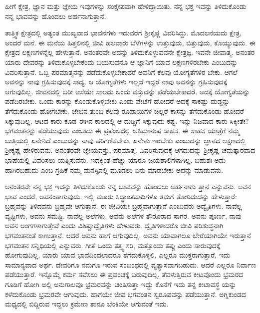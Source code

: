 {\small ಹೀಗೆ ಕ್ಷೇತ್ರ, ಜ್ಞಾನ ಮತ್ತು ಜ್ಞೇಯ ಇವುಗಳನ್ನು ಸಂಕ್ಷೇಪವಾಗಿ ಹೇಳಿದ್ದಾಯಿತು. ನನ್ನ ಭಕ್ತ ಇವನ್ನು ತಿಳಿದುಕೊಂಡು ನನ್ನ ಭಾವವನ್ನು ಹೊಂದಲು ಅರ್ಹನಾಗುತ್ತಾನೆ.}

ತಾತ್ತ್ವಿಕ ಕ್ಷೇತ್ರದಲ್ಲಿ ಅತ್ಯಂತ ಮುಖ್ಯವಾದ ಭಾವನೆಗಳು ಇದುವರೆಗೆ ಶ್ರೀಕೃಷ್ಣ ವಿವರಿಸಿದ್ದು. ಮೊದಲನೆಯದು ಕ್ಷೇತ್ರ, ಅಂದರೆ ಮನೆ. ಈ ಮನೆಯ ಹಿತ್ತಲಿನಲ್ಲಿ ಜೀವಿ ಹಲವಾರು ಬೆಳೆಗಳನ್ನು ಉತ್ತುವುದು, ಬಿತ್ತುವುದು, ಕೊಯ್ಯುವುದು. ಈ ಕ್ಷೇತ್ರದ ಲಕ್ಷಣಗಳನ್ನೆಲ್ಲ ಹೇಳುತ್ತಾನೆ. ಅನಂತರವೇ ಅದನ್ನು ತಿಳಿದುಕೊಳ್ಳುವವನೇ ಕ್ಷೇತ್ರಜ್ಞ. ಇವನೇ ಜೀವಾತ್ಮ. ಅನಂತರ ಯಾರು ದೇವರನ್ನು ತಿಳಿದುಕೊಳ್ಳಬೇಕೆಂದು ಬಯಸುವನೊ ಆ ಜ್ಞಾನಿಗೆ ಯಾವ ಲಕ್ಷಣಗಳಿರಬೇಕು ಎಂಬುದನ್ನು ವಿವರಿಸುತ್ತಾನೆ. ಒಬ್ಬ ಪರಮಾತ್ಮನನ್ನು ಪಡೆದುಕೊಳ್ಳಬೇಕಾದರೆ ಅವನಿಗೆ ಕೆಲವು ಯೋಗ್ಯತೆಗಳಿರ ಬೇಕು. ಆಗಲೆ ಅವನನ್ನು ನಾವು ಗ್ರಹಿಸುವುದಕ್ಕೆ ಸಾಧ್ಯ. ಆ ಯೋಗ್ಯತೆಗಳು ಇಲ್ಲದೆ ಇದ್ದರೆ ನಾವು ಅವನನ್ನು ಗ್ರಹಿಸುವುದಕ್ಕೆ ಆಗುವುದಿಲ್ಲ. ಜೀವನದಲ್ಲಿ ಬರೀ ಆಸೆಯೇ ಸಾಲದು ಒಂದು ವಸ್ತುವನ್ನು ಪಡೆಯಬೇಕಾದರೆ. ಅದಕ್ಕೆ ಯೋಗ್ಯತೆಯನ್ನು ಪಡೆದಿರಬೇಕು. ಒಂದು ಕಾರನ್ನು ಕೊಂಡುಕೊಳ್ಳಬೇಕು ಎಂದು ಪೇಟೆಗೆ ಹೋದರೆ ಅದಕ್ಕೆ ಸಾಕಷ್ಟು ದುಡ್ಡನ್ನು ತೆಗೆದುಕೊಂಡು ಹೋಗಬೇಕು. ಜೇಬಿನ ತುಂಬ ಕೆಲವು ರೂಪಾಯಿಗಳ ಚಿಲ್ಲರೆ ಕಾಸನ್ನು ತೆಗೆದುಕೊಂಡು ಹೋದರೆ ಸಿಕ್ಕುವುದಿಲ್ಲ. ಆಟದ ಕಾರು ಕೂಡ ಈಗಿನ ಕಾಲದಲ್ಲಿ ಆ ದುಡ್ಡಿಗೆ ಸಿಕ್ಕುವುದು ಕಷ್ಟ. ಇನ್ನು ನಿಜವಾದ ಕಾರು ಸಿಕ್ಕೀತೇ? ಭಗವಂತನನ್ನು ಪಡೆಯುವುದು ಎಂಬುದು ಈ ಪ್ರಪಂಚದಲ್ಲಿ ಅತಿಮಾನುಷ ಸಾಹಸ. ಈ ಸಾಹಸ ಯಾತ್ರೆಗೆ ನಮ್ಮ ಬುತ್ತಿಯಲ್ಲಿ ಏನೇನಿದೆ ಎಂಬುದನ್ನು ನಾವು ಪರಿಗಣಿಸಬೇಕು. ಏನೇನು ಇರಬೇಕು ಎಂಬುದನ್ನು ಜ್ಞಾನದ ಲಕ್ಷಣದಲ್ಲಿ ಶ್ರೀಕೃಷ್ಣ ಹೇಳಿರುವನು. ಅನಂತರವೇ ಜ್ಞೇಯವಸ್ತು, ಪರಮಾತ್ಮ. ವಿವರಿಸುವುದಕ್ಕೆ ಆಗದುದನ್ನು ಶ್ರೀಕೃಷ್ಣ ಚಮತ್ಕಾರವಾದ ಭಾಷೆಯಲ್ಲಿ ವಿವರಿಸಲು ಯತ್ನಿಸುವನು. ಇದಕ್ಕಿಂತ ಹೆಚ್ಚು ಯಾರೂ ಜಯಶಾಲಿಗಳಾಗಿಲ್ಲ. ಬಹುಶಃ ಅದು ಹಾಗಿರಬಹುದು ಎಂಬ ಗ್ರಹಿಕೆ ನಮ್ಮ ಮನಸ್ಸಿನಲ್ಲಿ ಮೂಡಲು ಏನು ಮಾಡಬೇಕು ಅದನ್ನು ಮಾಡುವನು.

ಅನಂತರವೇ ನನ್ನ ಭಕ್ತ ಇದನ್ನು ತಿಳಿದುಕೊಂಡು ನನ್ನ ಭಾವವನ್ನು ಹೊಂದಲು ಅರ್ಹನಾಗು ತ್ತಾನೆ ಎನ್ನುವನು. ಅವನ ಭಾವ ಎಂದರೆ, ಅವನಂತಾಗುವುದು. ಇಲ್ಲಿ ಮೂರು ಸಿದ್ಧಾಂತವಾದಿಗಳೂ ತಮಗೆ ತೋರಿದುದನ್ನು ಹೇಳುತ್ತಾರೆ: ಬ್ರಹ್ಮವನ್ನು ತಿಳಿದವನು ಬ್ರಹ್ಮವೇ ಆಗುತ್ತಾನೆ. ಈ ಜೀವಿಯೇ ಬ್ರಹ್ಮವಾಗುತ್ತಾನೆ ಎಂಬುವರು ಅದ್ವೈತಿಗಳು. ನಾವೆಲ್ಲ ವ್ಯಷ್ಟಿಗಳು, ಅವನು ಸಮಷ್ಟಿ. ನಾವೆಲ್ಲ ಅಲೆಗಳು, ಅವನು ಅಲೆಗಳ ತೌರೂರಾದ ಸಾಗರ. ಅವನು ಪೂರ್ಣ, ನಾವು ಅವನ ಅಂಗಗಳಾಗುತ್ತೇವೆ ಎಂದು ವಿಶಿಷ್ಟಾದ್ವೈತಿಗಳು ಹೇಳುವರು. ದ್ವೈತಿಗಳಾದರೊ ಜೀವಿ ಪರಿಶುದ್ಧನಾಗಿ ಭಗವಂತನಂತೆ ಕಾಣುತ್ತಾನೆ. ಆದರೆ ಅವನು ಹಾಗೆ ಆಗುವುದಿಲ್ಲ. ಅವನು ಯಾವಾಗಲೂ ಬೇರೆಯಾಗಿಯೇ ಇರುತ್ತಾನೆ ಭಗವಂತನ ಸನ್ನಿಧಿಯಲ್ಲಿ ಎನ್ನುವರು. ಗೀತೆ ಒಂದು ತತ್ತ್ವ ಸರಿ, ಮತ್ತೊಂದು ತಪ್ಪು ಎಂದು ಸಾರುವುದಕ್ಕೆ ಹೋಗುವುದಿಲ್ಲ. ಯಾರು ಯಾವ ಭಾವದಿಂದಲಾದರೂ ತೆಗೆದುಕೊಳ್ಳಲಿ, ಎಲ್ಲರೂ ಮುಕ್ತರಾಗುತ್ತಾರೆ, ಇದು ಸಾಮಾನ್ಯವಾದ ಅರ್ಥ. ದೇವರಿಗೂ ನಮಗೂ ಇರುವ ಸಂಬಂಧದಲ್ಲಿ ವ್ಯತ್ಯಾಸವಾಗಬಹುದು. ಆದರೆ ಎಲ್ಲರೂ ನಿರ್ವಾಣ ಪಡೆಯುತ್ತಾರೆ. ಇನ್ನೊಮ್ಮೆ ಕರ್ಮ ಸವೆಸಲು ಈ ಪ್ರಪಂಚಕ್ಕೆ ಬರುವುದಿಲ್ಲ. ತೆವಳುತ್ತಿರುವ ಕೀಟವೊಂದು ಭ್ರಮರದ ಗೂಡಿಗೆ ಹೋಗಿ ಅಲ್ಲಿ ಅನುಗಾಲವೂ ಭ್ರಮರವನ್ನು ಚಿಂತಿಸುತ್ತಾ ಇದ್ದು ಕೊನೆಗೆ ಇದು ತನ್ನ ಕೀಟಾವಸ್ಥೆ ಯನ್ನು ಕಳೆದುಕೊಂಡು ಭ್ರಮರವೇ ಆಗುವುದು. ಹಾಗೆಯೇ ಜೀವ ಭಗವಂತನ ಸ್ವರೂಪವನ್ನು ಪಡೆಯುತ್ತಾನೆ. ಅಗ್ನಿಕುಂಡದ ಮಧ್ಯದಲ್ಲಿ ಬಿದ್ದಿರುವ ಇದ್ದಲು ಕ್ರಮೇಣ ತಾನೂ ಬೆಂಕಿಯೇ ಆಗುವಂತೆ ಇದು.


